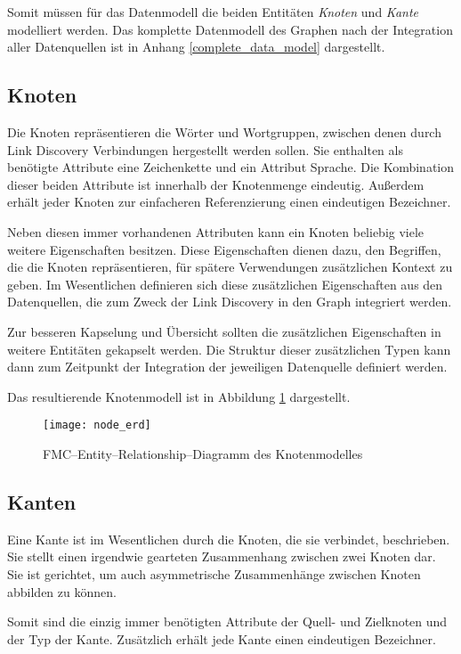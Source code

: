 Somit müssen für das Datenmodell die beiden Entitäten \emph{Knoten} und \emph{Kante} modelliert werden.
Das komplette Datenmodell des Graphen nach der Integration aller Datenquellen ist in Anhang \ref{complete_data_model} dargestellt.

\subsection{Knoten}

Die Knoten repräsentieren die Wörter und Wortgruppen, zwischen denen durch Link Discovery Verbindungen hergestellt werden sollen. Sie enthalten als benötigte Attribute eine Zeichenkette und ein Attribut Sprache. Die Kombination dieser beiden Attribute ist innerhalb der Knotenmenge eindeutig. Außerdem erhält jeder Knoten zur einfacheren Referenzierung einen eindeutigen Bezeichner.

Neben diesen immer vorhandenen Attributen kann ein Knoten beliebig viele weitere Eigenschaften besitzen. Diese Eigenschaften dienen dazu, den Begriffen, die die Knoten repräsentieren, für spätere Verwendungen zusätzlichen Kontext zu geben. Im Wesentlichen definieren sich diese zusätzlichen Eigenschaften aus den Datenquellen, die zum Zweck der Link Discovery in den Graph integriert werden.

Zur besseren Kapselung und Übersicht sollten die zusätzlichen Eigenschaften in weitere Entitäten gekapselt werden. Die Struktur dieser zusätzlichen Typen kann dann zum Zeitpunkt der Integration der jeweiligen Datenquelle definiert werden.

Das resultierende Knotenmodell ist in Abbildung \ref{fig:node_erd} dargestellt.

\begin{figure}
\centering
\texttt{[image: node\_erd]}
\caption{FMC--Entity--Relationship--Diagramm des Knotenmodelles}
\label{fig:node_erd}
\end{figure}

\subsection{Kanten}

Eine Kante ist im Wesentlichen durch die Knoten, die sie verbindet, beschrieben. Sie stellt einen irgendwie gearteten Zusammenhang zwischen zwei Knoten dar. Sie ist gerichtet, um auch asymmetrische Zusammenhänge zwischen Knoten abbilden zu können.

Somit sind die einzig immer benötigten Attribute der Quell- und Zielknoten und der Typ der Kante. Zusätzlich erhält jede Kante einen eindeutigen Bezeichner.

